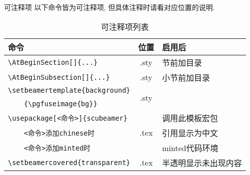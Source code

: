 \documentclass[hyperref,UTF8,11pt]{beamer}
\begin{document}
\begin{frame}[fragile]{可注释项}
	以下命令皆为可注释项, 但具体注释时请看对应位置的说明.
	\begin{table}[h]
		\centering
		\caption{可注释项列表}
		\begin{tabular}{>{\raggedright\arraybackslash}p{0.48\paperwidth}c>{\centering\arraybackslash}p{0.24\paperwidth}}
			\toprule
			命令 & 位置 & 启用后 \\
			\midrule
			\verb|\AtBeginSection[]{...}| & .sty & 节前加目录 \\[.5ex]
			\verb|\AtBeginSubsection[]{...}| & .sty & 小节前加目录 \\[.5ex]
			\verb|\setbeamertemplate{background}| & \multirow{2}{*}{.sty} & \multirow{2}{*}{设置背景图片} \\
			~~~~\verb|{\pgfuseimage{bg}}| & & \\[.5ex]
			\verb|\usepackage[<命令>]{scubeamer}| & \multirow{3}{*}{.tex} & 调用此模板宏包 \\
			~~~~\verb|<命令>添加chinese时| & & 引用显示为中文\\
			~~~~\verb|<命令>添加minted时| & & minted代码环境\\[.5ex]
			\verb|\setbeamercovered{transparent}| & .tex & 半透明显示未出现内容 \\
			\bottomrule
		\end{tabular}
	\end{table}
\end{frame}
\end{document}

